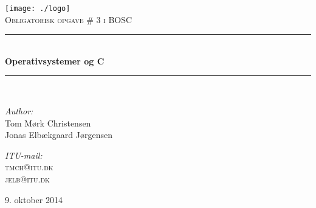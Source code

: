 \begin{titlepage}
\begin{center}


\texttt{[image: ./logo]}\\[1cm]

\textsc{\Large Obligatorisk opgave \# 3 i BOSC}\\[0.5cm]

\rule{\linewidth}{0.5mm} \\[0.3cm]
{ \LARGE \bfseries Operativsystemer og C\\[0.3cm]}
\rule{\linewidth}{0.5mm} \\[1.5cm]

\begin{minipage}{0.5\textwidth}
\begin{flushleft} \large
\emph{Author:}\\
Tom Mørk Christensen\\
Jonas Elbækgaard Jørgensen
\end{flushleft}
\end{minipage}
\begin{minipage}{0.3\textwidth}
\begin{flushright} \large
\emph{ITU-mail:} \\
\textsc{tmch@itu.dk} \\
\textsc{jelb@itu.dk}
\end{flushright}
\end{minipage}

\vfill

\large 9. oktober 2014

\end{center}
\end{titlepage}
